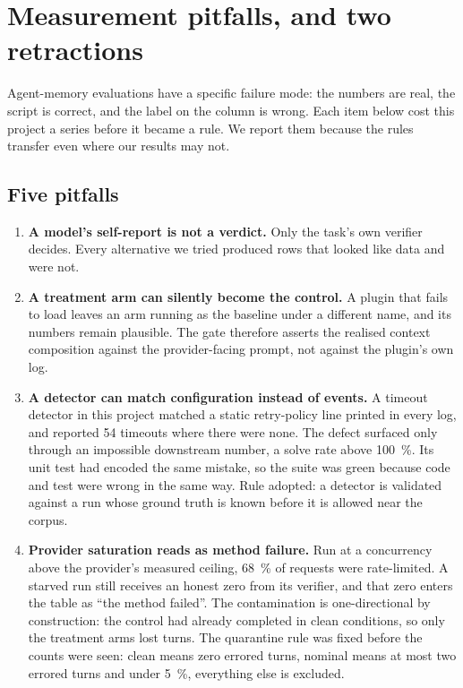 \section{Measurement pitfalls, and two retractions}
\label{sec:pitfalls}

Agent-memory evaluations have a specific failure mode: the numbers are real,
the script is correct, and the label on the column is wrong. Each item below
cost this project a series before it became a rule. We report them because
the rules transfer even where our results may not.

\subsection{Five pitfalls}

\begin{enumerate}
\item \textbf{A model's self-report is not a verdict.} Only the task's own
      verifier decides. Every alternative we tried produced rows that looked
      like data and were not.

\item \textbf{A treatment arm can silently become the control.} A plugin
      that fails to load leaves an arm running as the baseline under a
      different name, and its numbers remain plausible. The gate therefore
      asserts the realised context composition against the provider-facing
      prompt, not against the plugin's own log\code.

\item \textbf{A detector can match configuration instead of events.} A
      timeout detector in this project matched a static retry-policy line
      printed in every log, and reported 54 timeouts where there were
      none\live. The defect surfaced only through an impossible downstream
      number, a solve rate above \SI{100}{\percent}. Its unit test had
      encoded the same mistake, so the suite was green because code and test
      were wrong in the same way. Rule adopted: a detector is validated
      against a run whose ground truth is known before it is allowed near
      the corpus.

\item \textbf{Provider saturation reads as method failure.} Run at a
      concurrency above the provider's measured ceiling, \SI{68}{\percent}
      of requests were rate-limited\live. A starved run still receives an
      honest zero from its verifier, and that zero enters the table as ``the
      method failed''. The contamination is one-directional by construction:
      the control had already completed in clean conditions, so only the
      treatment arms lost turns. The quarantine rule was fixed before the
      counts were seen: clean means zero errored turns, nominal means at
      most two errored turns and under \SI{5}{\percent}, everything else is
      excluded.


\end{enumerate}
